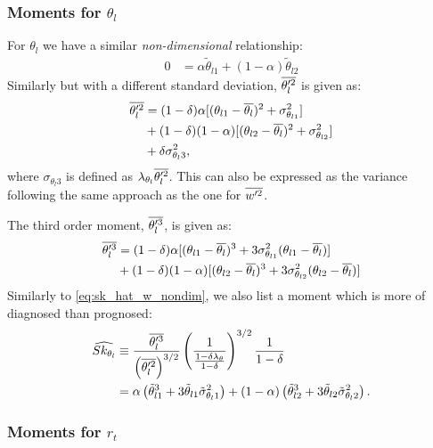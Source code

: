 \subsubsection{Moments for $\theta_l$}\label{subsubsec:lowerordermoments_thl}

For $\theta_l$ we have a similar \emph{non-dimensional} relationship:
\begin{align}
    \label{eq:thlp_bar_nondim}
    0 &= \alpha \tilde{\theta}_{l1} + (1 - \alpha) \tilde{\theta}_{l2}
\end{align}
Similarly but with a different standard deviation, $\overline{\theta_l'^2}$ is given as:
\begin{align}
    \label{eq:thlp2_bar}
    \overline{\theta_l'^2}
    &= (1 - \delta) \alpha [(\theta_{l1} - \overline{\theta_l})^2 + \sigma_{\theta_{l1}}^2] \nonumber\\
    &+ (1 - \delta) (1 - \alpha) [(\theta_{l2} - \overline{\theta_l})^2 + \sigma_{\theta_{l2}}^2] \nonumber\\
    &+ \delta \sigma_{\theta_l 3}^2,
\end{align}
where $\sigma_{\theta_l 3}$ is defined as $\lambda_{\theta_l} \overline{\theta_l'^2}$.
This can also be expressed as the variance following the same approach as the one for $\overline{w'^2}$.

The third order moment, $\overline{\theta_l'^3}$, is given as:
\begin{align}
    \label{eq:theta_l_3_bar}
    \overline{\theta_l'^3}
    &= (1 - \delta) \alpha [(\theta_{l1} - \overline{\theta_l})^3 + 3 \sigma_{\theta_{l1}}^2 (\theta_{l1} - \overline{\theta_l})] \nonumber\\
    &+ (1 - \delta) (1 - \alpha) [(\theta_{l2} - \overline{\theta_l})^3 + 3 \sigma_{\theta_{l2}}^2 (\theta_{l2} - \overline{\theta_l})]
\end{align}
Similarly to \cref{eq:sk_hat_w_nondim}, we also list a moment which is more of diagnosed than prognosed:
\begin{align}
    \widehat{Sk_{\theta_l}}
    &\equiv \frac{\overline{\theta_l'^3}}{\left( \overline{\theta_l'^2} \right)^{3/2}}\left( \frac{1}{\frac{1-\delta \lambda_\theta}{1-\delta}} \right)^{3/2}
    \frac{1}{1-\delta} \nonumber\\
    &= \alpha \left( \tilde{\theta}_{l1}^3 + 3 \tilde{\theta}_{l1} \tilde{\sigma}_{\theta_l 1}^2 \right) + (1 - \alpha) \left( \tilde{\theta}_{l2}^3 + 3 \tilde{\theta}_{l2} \tilde{\sigma}_{\theta_l 2}^2 \right).
    \label{eq:sk_hat_theta_l_nondim}
\end{align}

\subsubsection{Moments for $r_t$}\label{subsubsec:lowerordermoments_rt}

